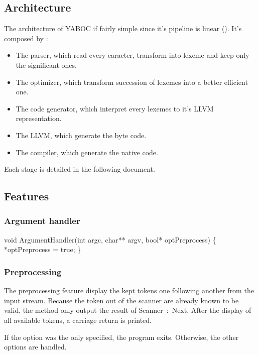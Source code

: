 \subsection{Architecture}
The architecture of \gls{YABOC} if fairly simple since it's pipeline is linear (\cf {}).
It's composed by :
\begin{itemize}
        \item The parser, which read every caracter, transform into \gls{lexeme} and keep only the significant ones.
        \item The optimizer, which transform succession of lexemes into a better efficient one.
        \item The code generator, which interpret every lexemes to it's LLVM representation.
        \item The LLVM, which generate the byte code.
        \item The compiler, which generate the native code.
\end{itemize}

\newpar Each stage is detailed in the following document.

\subsection{Features}
\subsubsection{Argument handler}
\nwenddocs{}\endmoddef\nwstartdeflinemarkup\nwenddeflinemarkup
void ArgumentHandler(int argc, char** argv, bool* optPreprocess) \{
        *optPreprocess = true;
\}
\nwendcode{}\nwdocspar

\subsubsection{Preprocessing}
The preprocessing feature display the kept tokens one following another from the input stream. Because the token out of the scanner are already known to be valid, the method only output the result of {\Tt{}Scanner\ :\ Next\nwendquote}. After the display of all available tokens, a carriage return is printed.

\newpar If the option was the only specified, the program exits. Otherwise, the other options are handled.

